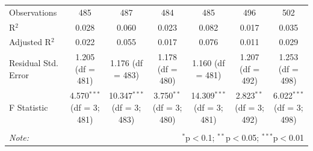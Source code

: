 \documentclass{article}
\begin{document}
\begin{landscape}
\begin{table}[!htbp]
\begin{tabular}{@{\extracolsep{5pt}}lcccccc}
Observations & 485 & 487 & 484 & 485 & 496 & 502 \\ 
R$^{2}$ & 0.028 & 0.060 & 0.023 & 0.082 & 0.017 & 0.035 \\ 
Adjusted R$^{2}$ & 0.022 & 0.055 & 0.017 & 0.076 & 0.011 & 0.029 \\ 
Residual Std. Error & 1.205 (df = 481) & 1.176 (df = 483) & 1.178 (df = 480) & 1.160 (df = 481) & 1.207 (df = 492) & 1.253 (df = 498) \\ 
F Statistic & 4.570$^{***}$ (df = 3; 481) & 10.347$^{***}$ (df = 3; 483) & 3.750$^{**}$ (df = 3; 480) & 14.309$^{***}$ (df = 3; 481) & 2.823$^{**}$ (df = 3; 492) & 6.022$^{***}$ (df = 3; 498) \\ 
\hline 
\hline \\[-1.8ex] 
\textit{Note:}  & \multicolumn{6}{r}{$^{*}$p$<$0.1; $^{**}$p$<$0.05; $^{***}$p$<$0.01} \\ 
\end{tabular} 
\end{table}
\end{landscape}
\end{document}
